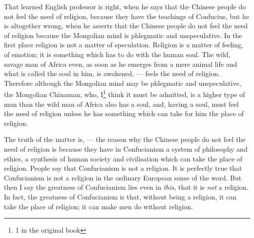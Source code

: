 That learned English professor is right, when he says that the Chinese people do not feel the need of religion, because they have the teachings of Confucius, but he is altogether wrong, when he asserts that the Chinese people do not feel the need of religion because the Mongolian mind is phlegmatic and unspeculative. 
In the first place religion is not a matter of speculation.
Religion is a matter of feeling, of emotion; it is something which has to do with the human soul.
The wild, savage man of Africa even, as soon as he emerges from a mere animal life and what is called the soul in him, is awakened, --- feels the need of religion.
Therefore although the Mongolian mind may be phlegmatic and unspeculative, the Mongolian Chinaman, who, I\footnote{1 in the original book} think it must be admitted, is a higher type of man than the wild man of Africa also has a soul, and, having a soul, must feel the need of religion unless he has something which can take for him the place of religion.

The truth of the matter is, --- the reason why the Chinese people do not feel the need of religion is because they have in Confucianism a system of philosophy and ethics, a synthesis of human society and civilisation which can take the place of religion.
People say that Confucianism is not a religion.
It is perfectly true that Confucianism is not a religion in the ordinary European sense of the word.
But then I say the greatness of Confucianism lies even in \emph{this}, that it is \emph{not} a religion.
In fact, the greatness of Confucianism is that, without being a religion, it can take the place of religion; it can make men do without religion.

